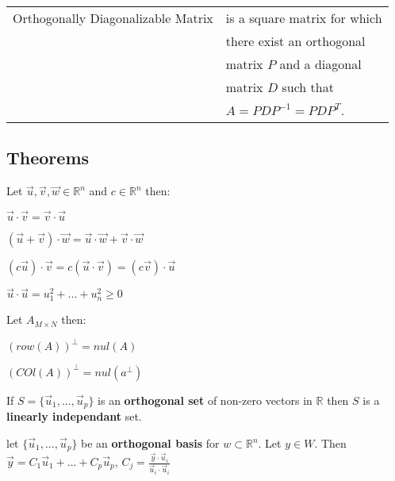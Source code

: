 \documentclass[5pt]{article}
\begin{document}
\begin{multicols}{2}
\begin{tabular}{ll}
\end{tabular}
\begin{tabular}{ll}
  Orthogonally Diagonalizable Matrix & is a square matrix for which\\
                                     & there exist an orthogonal \\
                                     & matrix $P$ and a diagonal \\
                                     & matrix $D$ such that \\
                                     & $A=PDP^{-1}=PDP^T$.
\end{tabular}

\subsection{Theorems}
\begin{properties}
  Let $\vec{u},\vec{v},\vec{w} \in \mathbb{R}^n$ and $c\in \mathbb{R}^n$ then:\\
  \begin{itemize*}
    \item $\vec{u}\cdot\vec{v}=\vec{v}\cdot\vec{u}$ 
    \item $(\vec{u}+\vec{v})\cdot \vec{w}=\vec{u}\cdot\vec{w}+\vec{v}\cdot \vec{w}$
    \item $(c\vec{u})\cdot \vec{v}=c(\vec{u}\cdot \vec{v})=(c\vec{v})\cdot \vec{u}$
    \item $\vec{u}\cdot \vec{u}=u_1^2+...+u^2_n\geq 0$
  \end{itemize*}
\end{properties}

\begin{theorem}
  Let $A_{M\times N}$ then:
  \begin{itemize*}
    \item $(row(A))^\perp=nul(A)$
    \item $(COl(A))^\perp=nul(a^\perp)$
  \end{itemize*}
\end{theorem}

\begin{theorem}
  If $S=\{\vec{u}_1,...,\vec{u}_p\}$ is an \textbf{orthogonal set} of non-zero vectors in $\mathbb{R}$ then $S$ is a \textbf{linearly independant} set. 
\end{theorem}

\begin{theorem}
  let $\{\vec{u}_1,...,\vec{u}_p\}$ be an \textbf{orthogonal basis} for $w\subset \mathbb{R}^n$. 
  Let $y\in W$. Then $\vec{y}=C_1\vec{u}_1 + ... + C_p\vec{u}_p$, $C_j=\frac{\vec{y}\cdot\vec{u}_i}{\vec{u}_i\cdot\vec{u}_i}$
\end{theorem}


\end{multicols}
\end{document}

